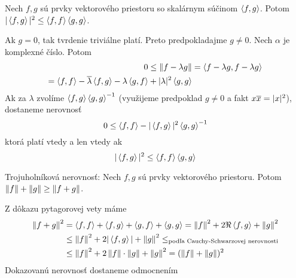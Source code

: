 \begin{veta}
    Nech $f,g$ sú prvky vektorového priestoru so skalárnym súčinom
    $\left\langle f,g \right\rangle$.
    Potom $|\left\langle f,g \right\rangle|^2 \le \left\langle f,f \right\rangle \left\langle g,g \right\rangle$.
    \label{veta:cauchy_schwarz}
\end{veta}
\begin{dokaz}
    Ak $g=0$, tak tvrdenie triviálne platí. Preto predpokladajme
    $g\not=0$. Nech $\alpha$ je komplexné číslo. Potom
    \begin{equation*}
    \begin{split}
        0\le \left\lVert f-\lambda g\right\rVert &= \left\langle f-\lambda g,f-\lambda g \right\rangle
        \\
        =\left\langle f,f \right\rangle - \overline{\lambda}\left\langle f,g \right\rangle -
        \lambda \left\langle g,f \right\rangle + |\lambda|^2 \left\langle g,g \right\rangle
    \end{split}
    \end{equation*}
    Ak za $\lambda$ zvolíme $\left\langle f,g \right\rangle \left\langle g,g \right\rangle^{-1}$ (využijeme
    predpoklad $g\not=0$ a fakt $x\overline{x} = |x|^2$), dostaneme nerovnosť
    \begin{equation*}
        0\le \left\langle f,f \right\rangle - |\left\langle f,g \right\rangle|^2 \left\langle g,g \right\rangle^{-1}
    \end{equation*}
    ktorá platí vtedy a len vtedy ak
    \begin{equation*}
        |\left\langle f,g \right\rangle|^2 \le \left\langle f,f \right\rangle \left\langle g,g \right\rangle
    \end{equation*}
\end{dokaz}

\begin{lema}
    Trojuholníková nerovnosť: Nech $f,g$ sú prvky vektorového
    priestoru. Potom $\left\lVert f\right\rVert+\left\lVert g\right\rVert \ge \left\lVert f+g\right\rVert$.
\end{lema}
\begin{dokaz}
    Z dôkazu pytagorovej vety máme
    \begin{equation*}
    \begin{split}
        \left\lVert f+g\right\rVert^2 &= \left\langle f,f \right\rangle + \left\langle f,g \right\rangle + \left\langle g,f \right\rangle +
        \left\langle g,g \right\rangle =
        \left\lVert f\right\rVert^2 + 2\Re\left\langle f,g \right\rangle + \left\lVert g\right\rVert^2 \\ 
        &\le 
        \left\lVert f\right\rVert^2 + 2|\left\langle f,g \right\rangle| + \left\lVert g\right\rVert^2 \le 
        _\text{podľa Cauchy-Schwarzovej nerovnosti}\\
        &\le\left\lVert f\right\rVert^2 + 2\left\lVert f\right\rVert\cdot\left\lVert g\right\rVert + \left\lVert g\right\rVert^2 = 
        (\left\lVert f\right\rVert + \left\lVert g\right\rVert)^2
    \end{split}
    \end{equation*}
    Dokazovanú nerovnosť dostaneme odmocnením 
\end{dokaz}

